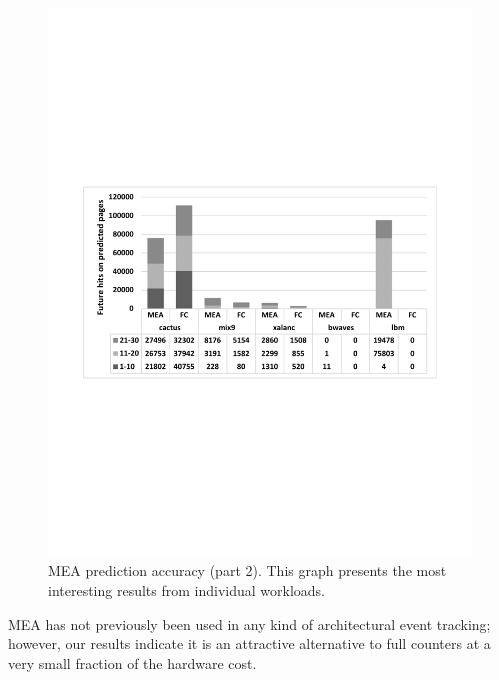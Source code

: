 \begin{figure}[t]
\centering
  \includegraphics[scale=.45]{figures/mea_3_v2.pdf}
  \caption{MEA prediction accuracy (part 2). This graph presents the most interesting results from individual workloads.}
  \label{fig:mea_3}
\end{figure}

MEA has not previously been used in any kind of architectural event
tracking; however, our results indicate it is an attractive
alternative to full counters at a very small fraction of the hardware cost.
